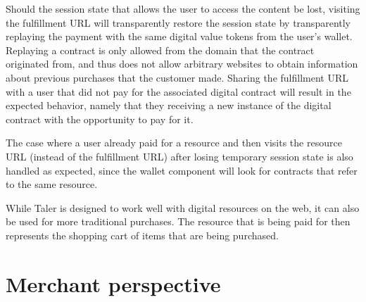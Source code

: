 \documentclass[twoside,letterpaper]{sigalternate}
\begin{document}

Should the session state that allows the user to access the content be lost,
visiting the fulfillment URL will transparently restore the session state by
transparently replaying the payment with the same digital value tokens from the
user's wallet.  Replaying a contract is only allowed from the domain that the
contract originated from, and thus does not allow arbitrary websites to obtain
information about previous purchases that the customer made.  Sharing the
fulfillment URL with a user that did not pay for the associated digital
contract will result in the expected behavior, namely that they receiving a new
instance of the digital contract with the opportunity to pay for it.


The case where a user already paid for a resource and then visits
the resource URL (instead of the fulfillment URL) after losing temporary
session state is also handled as expected, since the wallet component will
look for contracts that refer to the same resource.

While Taler is designed to work well with digital resources on the web,
it can also be used for more traditional purchases.  The resource that
is being paid for then represents the shopping cart of items that
are being purchased.

\section{Merchant perspective}



\end{document}
